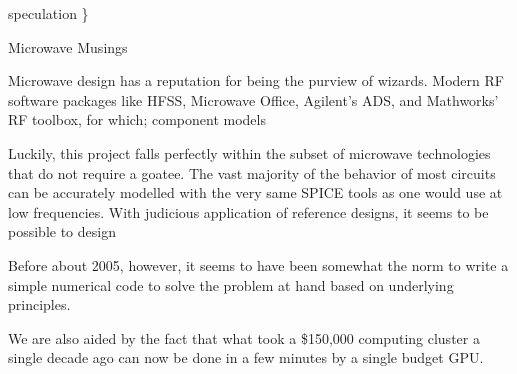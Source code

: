 \documentclass[fleqn,10pt]{article}
\begin{document}
{\color{red} speculation \} } 





\clearpage
{\Large Microwave Musings}\\
\begin{multicols}{1}

\noindent{}
%


Microwave design has a reputation for being the purview of wizards. Modern RF software packages like HFSS, Microwave Office, Agilent's ADS, and Mathworks' RF toolbox, for which; component models 

Luckily, this project falls perfectly within the subset of microwave technologies that do not require a goatee. The vast majority of the behavior of most circuits can be accurately modelled with the very same SPICE tools as one would use at low frequencies. With judicious application of reference designs, it seems to be possible to design 

Before about 2005, however, it seems to have been somewhat the norm to write a simple numerical code to solve the problem at hand based on underlying principles.

We are also aided by the fact that what took a \$150,000 computing cluster a single decade ago can now be done in a few minutes by a single budget GPU.


\end{multicols}
\end{document}

